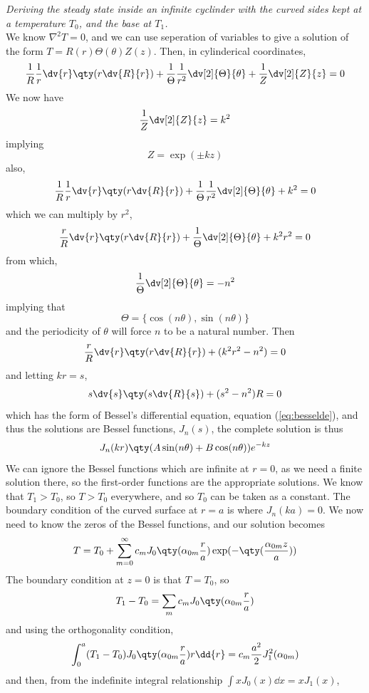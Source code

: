 \begin{example}
  {\em Deriving the steady state inside an infinite cyclinder with the curved sides kept at a temperature $T_0$, and the base at $T_1$.}\\
  We know $\nabla^2 T =0$, and we can use seperation of variables to give a solution of the form $T = R(r)\Theta(\theta)Z(z)$.
  Then, in cylinderical coordinates,
  \begin{equation*}
    \frac{1}{R}\frac{1}{r} \dv{r} \qty(r \dv{R}{r}) + \frac{1}{\Theta} \frac{1}{r^2} \dv[2]{\Theta}{\theta} + \frac{1}{Z} \dv[2]{Z}{z} = 0
  \end{equation*}
We now have
\[ \frac{1}{Z} \dv[2]{Z}{z} = k^2 \]
implying
\[ Z = \exp(\pm kz) \]
also,
\[ \frac{1}{R}\frac{1}{r} \dv{r} \qty(r \dv{R}{r}) + \frac{1}{\Theta} \frac{1}{r^2} \dv[2]{\Theta}{\theta} + k^2 = 0 \]
which we can multiply by $r^2$,
\[ \frac{r}{R} \dv{r} \qty(r \dv{R}{r}) + \frac{1}{\Theta} \dv[2]{\Theta}{\theta} + k^2 r^2 = 0 \]
from which,
\[ \frac{1}{\Theta} \dv[2]{\Theta}{\theta} = -n^2 \]
implying that
\[ \Theta = \{ \cos(n \theta), \sin(n \theta) \} \]
and the periodicity of $\theta$ will force $n$ to be a natural number.
Then
\[ \frac{r}{R} \dv{r} \qty(r \dv{R}{r}) + (k^2 r^2 - n^2) = 0 \]
and letting $kr = s$,
\[ s \dv{s} \qty( s \dv{R}{s} ) + (s^2 - n^2)R = 0 \] which has the
form of Bessel's differential equation, equation (\ref{eq:besselde}),
and thus the solutions are Bessel functions, $J_n(s)$,
the complete solution is thus
\begin{equation*}
  J_n (kr) \qty( A \sin(n\theta) + B \cos(n \theta) ) e^{-kz}
\end{equation*}
We can ignore the Bessel functions which are infinite at $r=0$, as we
need a finite solution there, so the first-order functions are the
appropriate solutions.  We know that $T_1 > T_0$, so $T>T_0$
everywhere, and so $T_0$ can be taken as a constant. The boundary
condition of the curved surface at $r=a$ is where $J_n(ka) = 0$. We
now need to know the zeros of the Bessel functions, and our solution becomes
\begin{equation*}
  T = T_0 + \sum_{m=0}^{\infty} c_m J_0 \qty(\alpha_{0m}\frac{r}{a}) \exp(-\qty(\frac{\alpha_{0m}z}{a}))
\end{equation*}
The boundary condition at $z=0$ is that $T=T_0$, so
\[ T_1 - T_0 = \sum_m c_m J_0 \qty( \alpha_{0m} \frac{r}{a}) \]
and using the orthogonality condition,
\[ \int_0^a (T_1 - T_0) J_0 \qty( \alpha_{0m} \frac{r}{a} ) r \dd{r} = c_m \frac{a^2}{2} J_1^2(\alpha_{0m}) \]
and then, from the indefinite integral relationship $\int x J_0(x) \dd{x} = x J_1(x)$,

\end{example}
